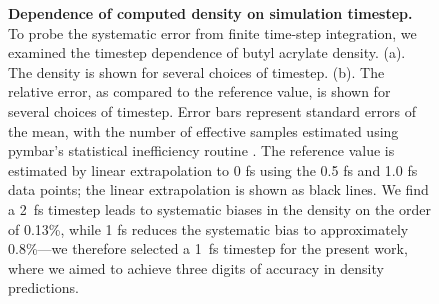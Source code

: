 \documentclass[aip, jcp, reprint]{revtex4-1}  %
\begin{document}
\begin{figure}


\caption{
{\bf Dependence of computed density on simulation timestep.}
To probe the systematic error from finite time-step integration, we examined the timestep dependence of butyl acrylate density.  
(a).  The density is shown for several choices of timestep.  
(b).  The relative error, as compared to the reference value, is shown for several choices of timestep.  
Error bars represent standard errors of the mean, with the number of effective samples estimated using pymbar's statistical inefficiency routine \cite{shirts2008statistically}.  
The reference value is estimated by linear extrapolation to 0 fs using the 0.5 fs and 1.0 fs data points; the linear extrapolation is shown as black lines.  
We find a 2~fs timestep leads to systematic biases in the density on the order of 0.13\%, while 1 fs reduces the systematic bias to approximately 0.8\%---we therefore selected a 1~fs timestep for the present work, where we aimed to achieve three digits of accuracy in density predictions.
}
\label{figure:timestep}

\end{figure}
\end{document}

